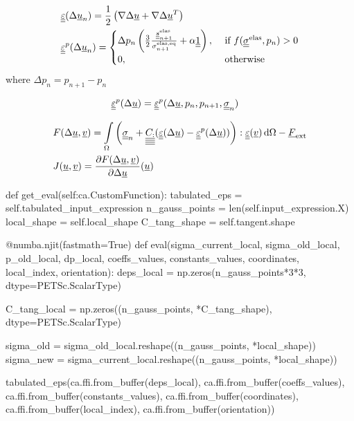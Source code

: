 \documentclass[12pt]{article}
\begin{document}
\begin{appendices}
    \begin{align}
        & \underline{\underline{\varepsilon}}(\Delta\underline{u}_n) = \frac{1}{2} \left( \nabla\Delta\underline{u} + \nabla\Delta\underline{u}^T \right) \\
        & \underline{\underline{\varepsilon}}^p(\Delta\underline{u}_n) = 
            \begin{cases}
                \Delta p_n \left( \frac{3}{2}\frac{\underline{\underline{s}}_{n+1}^\text{elas}}{\sigma_{n+1}^\text{elas,eq}} + \alpha \underline{\underline{1}} \right), & \text{ if } f(\underline{\underline{\sigma}}^\text{elas}, p_n) > 0  \\
                0, & \text{ otherwise}
            \end{cases}
    \end{align}
    where $\Delta p_n = p_{n+1} - p_n$ 

    \begin{align}
        & \underline{\underline{\varepsilon}}^p(\Delta\underline{u}) = \underline{\underline{\varepsilon}}^p(\Delta\underline{u}, p_n, p_{n+1}, \underline{\underline{\sigma}}_n)
    \end{align}

    \begin{align}
        & F(\Delta\underline{u}, \underline{v}) = \int\limits_\Omega \left( \underline{\underline{\sigma}}_n + \underline{\underline{\underline{\underline{C_{:}}}}} (\underline{\underline{\varepsilon}}(\Delta\underline{u}) - \underline{\underline{\varepsilon}}^p(\Delta\underline{u})) \right) : \underline{\underline{\varepsilon}}(\underline{v}) \, \mathrm{d}\Omega - \underline{F}_\text{ext} \\
        & J(\underline{u}, \underline{v}) = \frac{\partial F(\Delta\underline{u}, \underline{v})}{\partial\Delta\underline{u}}(\underline{u})
    \end{align}

    \begin{pythoncode}
        def get_eval(self:ca.CustomFunction):
        tabulated_eps = self.tabulated_input_expression
        n_gauss_points = len(self.input_expression.X)
        local_shape = self.local_shape
        C_tang_shape = self.tangent.shape
        
        @numba.njit(fastmath=True)
        def eval(sigma_current_local, sigma_old_local, p_old_local, dp_local, coeffs_values, constants_values, coordinates, local_index, orientation):
            deps_local = np.zeros(n_gauss_points*3*3, dtype=PETSc.ScalarType)
            
            C_tang_local = np.zeros((n_gauss_points, *C_tang_shape), dtype=PETSc.ScalarType)
            
            sigma_old = sigma_old_local.reshape((n_gauss_points, *local_shape))
            sigma_new = sigma_current_local.reshape((n_gauss_points, *local_shape))

            tabulated_eps(ca.ffi.from_buffer(deps_local), 
                        ca.ffi.from_buffer(coeffs_values), 
                        ca.ffi.from_buffer(constants_values), 
                        ca.ffi.from_buffer(coordinates), ca.ffi.from_buffer(local_index), ca.ffi.from_buffer(orientation))
            

\end{pythoncode}
\end{appendices}
\end{document}
